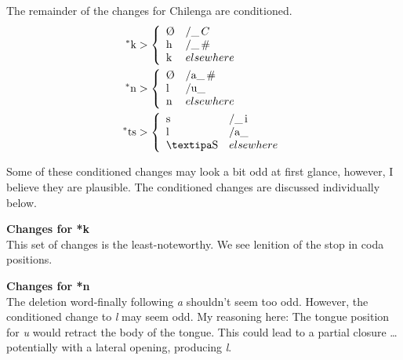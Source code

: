 \documentclass[12pt]{article}
\begin{document}
The remainder of the changes for Chilenga are conditioned.
\begin{align*}
^*\textrm{k} &> \left\{\begin{array}{ll}
\textrm{\O} & /\und C \\
\textrm{h} & /\und \# \\
\textrm{k} & elsewhere
\end{array}\right. \\
^*\textrm{n} &> \left\{\begin{array}{ll}
\textrm{\O} & /\textrm{a}\und\# \\
\textrm{l} & /\textrm{u}\und \\
\textrm{n} & elsewhere
\end{array}\right. \\
^*\textrm{ts} &> \left\{\begin{array}{ll}
\textrm{s} & /\und\textrm{i} \\
\textrm{l} & /\textrm{a}\und \\
\textrm{\ip{S}} & elsewhere
\end{array}\right.
\end{align*}
 
Some of these conditioned changes may look a bit odd at first glance, however, I believe they are plausible. The conditioned changes are discussed individually below.

{\bf Changes for *k} \\
This set of changes is the least-noteworthy. We see lenition of the stop in coda positions.

{\bf Changes for *n} \\
The deletion word-finally following {\it a} shouldn't seem too odd. However, the conditioned change to {\it l} may seem odd. My reasoning here: The tongue position for {\it u} would retract the body of the tongue. This could lead to a partial closure \ldots potentially with a lateral opening, producing {\it l}.
\end{document}
